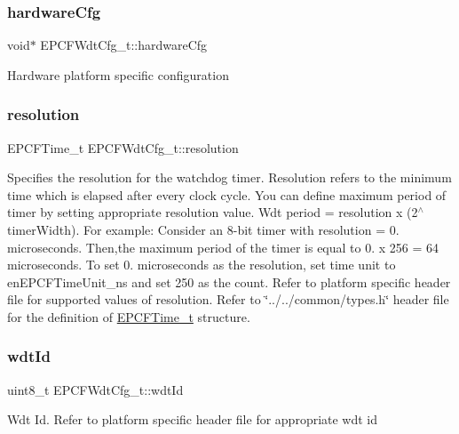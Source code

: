 \subsubsection{\texorpdfstring{hardware\+Cfg}{hardwareCfg}}
{\footnotesize\ttfamily void$\ast$ E\+P\+C\+F\+Wdt\+Cfg\+\_\+t\+::hardware\+Cfg}

Hardware platform specific configuration \mbox{\label{structEPCFWdtCfg__t_a0e7100e352a728e5e840767cb9d92a24}} 
\subsubsection{\texorpdfstring{resolution}{resolution}}
{\footnotesize\ttfamily E\+P\+C\+F\+Time\+\_\+t E\+P\+C\+F\+Wdt\+Cfg\+\_\+t\+::resolution}

Specifies the resolution for the watchdog timer. Resolution refers to the minimum time which is elapsed after every clock cycle. You can define maximum period of timer by setting appropriate resolution value. Wdt period = resolution x (2$^\wedge$timer\+Width). For example\+: Consider an 8-\/bit timer with resolution = 0. microseconds. Then,the maximum period of the timer is equal to 0. x 256 = 64 microseconds. To set 0. microseconds as the resolution, set time unit to en\+E\+P\+C\+F\+Time\+Unit\+\_\+ns and set 250 as the count. Refer to platform specific header file for supported values of resolution. Refer to \char`\"{}../../common/types.\+h\char`\"{} header file for the definition of \mbox{\hyperlink{}{E\+P\+C\+F\+Time\+\_\+t}} structure. \mbox{\label{structEPCFWdtCfg__t_afb08d8e549acea72e3b2091c14ce1c0f}} 
\subsubsection{\texorpdfstring{wdt\+Id}{wdtId}}
{\footnotesize\ttfamily uint8\+\_\+t E\+P\+C\+F\+Wdt\+Cfg\+\_\+t\+::wdt\+Id}

Wdt Id. Refer to platform specific header file for appropriate wdt id \mbox{\label{structEPCFWdtCfg__t_a0348efcb6bf2915041241dd217b2a307}} 
